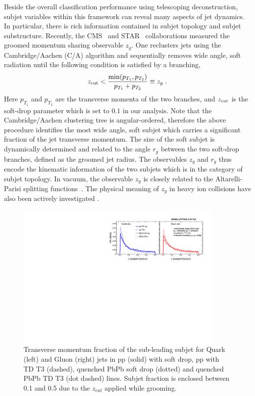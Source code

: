 \documentclass[notoc]{JHEP3}
\begin{document}
Beside the overall classification performance using telescoping deconstruction, subjet variables within this framework can reveal many aspects of jet dynamics. In particular, there is rich information contained in subjet topology and subjet substructure. Recently, the CMS~\cite{Sirunyan:2017bsd} and STAR~\cite{Kauder:2017mhg} collaborations measured the groomed momentum sharing observable $z_g$. One reclusters jets using the Cambridge/Aachen (C/A) algorithm \cite{Dokshitzer:1997in,Wobisch:1998wt} and sequentially removes wide angle, soft radiation until the following condition is satisfied by a branching,
\begin{equation}
    z_{\rm cut} < \frac{\min(p_{T_1},p_{T_2})}{p_{T_1}+p_{T_2}} \equiv z_g\;.
\label{SD}
\end{equation}
Here $p_{T_1}$ and $p_{T_2}$ are the transverse momenta of the two branches, and $z_{\rm cut}$ is the soft-drop parameter which is set to $0.1$ in our analysis. Note that the Cambridge/Aachen clustering tree is angular-ordered, therefore the above procedure identifies the most wide angle, soft subjet which carries a significant fraction of the jet transverse momentum. The size of the soft subjet is dynamically determined and related to the angle $r_g$ between the two soft-drop branches, defined as the groomed jet radius. The observables $z_g$ and $r_g$ thus encode the kinematic information of the two subjets which is in the category of subjet topology. In vacuum, the observable $z_g$ is closely related to the Altarelli-Parisi splitting functions~\cite{Altarelli:1977zs}. The physical meaning of $z_g$ in heavy ion collisions have also been actively investigated \cite{Chien:2016led,Mehtar-Tani:2016aco,Milhano:2017nzm,Chang:2017gkt,Li:2017wwc}.

\begin{figure}[t]
	   \centering
	   \includegraphics[width=0.9\textwidth]{plots/Comp_z.pdf}
	   \caption{Transverse momentum fraction of the sub-leading subjet for Quark (left) and Gluon (right) jets in pp (solid) with soft drop, pp with TD T3 (dashed), quenched PbPb soft drop (dotted) and quenched PbPb TD T3 (dot dashed) lines. Subjet fraction is enclosed between 0.1 and 0.5 due to the $z_{cut}$ applied while grooming.}
\label{fig:comp_z}
\end{figure}
\end{document}
